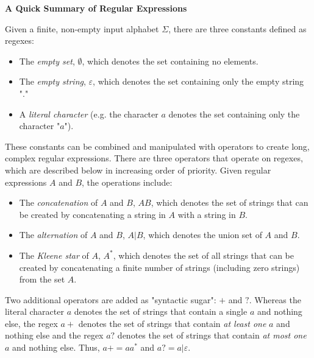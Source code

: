 \begin{tcolorbox}[breakable, enhanced, colback=textbook-blue, sharp corners]
	\vspace{3mm}
	\begin{center}
		\textbf{A Quick Summary of Regular Expressions}
	\end{center}

	Given a finite, non-empty input alphabet $\Sigma$, there are three constants defined as regexes:
	
	\begin{itemize}
		\item The \textit{empty set}, $\emptyset$, which denotes the set containing no elements.
		\item The \textit{empty string}, $\varepsilon$, which denotes the set containing only the empty string "."
		\item A \textit{literal character} (e.g. the character $a$ denotes the set containing only the character "$a$").
	\end{itemize}
	
	These constants can be combined and manipulated with operators to create long, complex regular expressions. There are three operators that operate on regexes, which are described below in increasing order of priority. Given regular expressions $A$ and $B$, the operations include:
	
	\begin{itemize}
		\item The \textit{concatenation} of $A$ and $B$, $AB$, which denotes the set of strings that can be created by concatenating a string in $A$ with a string in $B$.
		\item The \textit{alternation} of $A$ and $B$, $A|B$, which denotes the union set of $A$ and $B$.
		\item The \textit{Kleene star} of $A$, $A^*$, which denotes the set of all strings that can be created by concatenating a finite number of strings (including zero strings) from the set $A$.
	\end{itemize}
	
	Two additional operators are added as "syntactic sugar": $+$ and $?$. Whereas the literal character $a$ denotes the set of strings that contain a single $a$ and nothing else, the regex $a+$ denotes the set of strings that contain \textit{at least one} $a$ and nothing else and the regex $a?$ denotes the set of strings that contain \textit{at most one} $a$ and nothing else. Thus, $a+=aa^*$ and $a?=a|\varepsilon$. \\
	

\end{tcolorbox}

